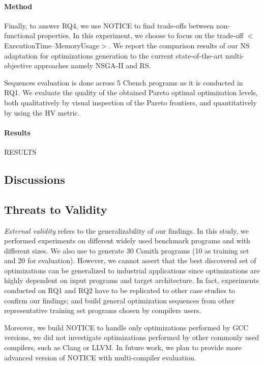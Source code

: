 \paragraph{Method}

Finally, to answer RQ4, we use NOTICE to find trade-offs between non-functional properties. In this experiment, we choose to focus on the trade-off $<$ExecutionTime--MemoryUsage$>$. We report the comparison results of our NS adaptation for optimizations generation to the current state-of-the-art multi-objective approaches namely NSGA-II and RS. 
  
Sequences evaluation is done across 5 Cbench programs as it is conducted in RQ1.
We evaluate the quality of the obtained Pareto optimal optimization levels, both qualitatively by visual inspection of the Pareto frontiers, and quantitatively by using the HV metric.



\paragraph{Results}
RESULTS

\noindent{}
\subsection{Discussions}
\subsection{Threats to Validity}
\textit{External validity} refers to the generalizability of our findings. In this study, we performed experiments on different widely used benchmark programs and with different sizes. We also use to generate 30 Csmith programs (10 as training set and 20 for evaluation). However, we cannot assert that the best discovered set of optimizations can be generalized to industrial applications since optimizations are highly dependent on input programs and target architecture. In fact, experiments conducted on RQ1 and RQ2 have to be replicated to other case studies to confirm our findings; and build general optimization sequences from other representative training set programs chosen by compilers users.

Moreover, we build NOTICE to handle only optimizations performed by GCC versions, we did not investigate optimizations performed by other commonly used compilers, such as Clang or LLVM. In future work, we plan to provide more advanced version of NOTICE with multi-compiler evaluation.

